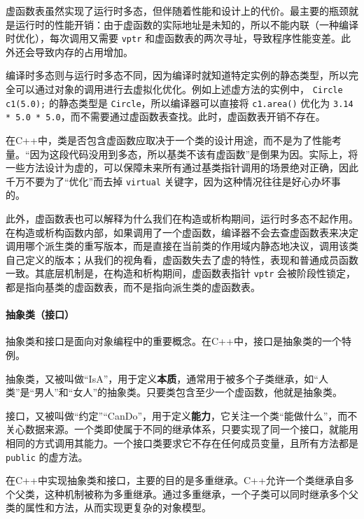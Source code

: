虚函数表虽然实现了运行时多态，但伴随着性能和设计上的代价。最主要的瓶颈就是运行时的性能开销：由于虚函数的实际地址是未知的，所以不能内联（一种编译时优化），每次调用又需要 \verb|vptr| 和虚函数表的两次寻址，导致程序性能变差。此外还会导致内存的占用增加。

编译时多态则与运行时多态不同，因为编译时就知道特定实例的静态类型，所以完全可以通过对象的调用进行去虚拟化优化。例如上述虚方法的实例中， \verb|Circle c1(5.0);| 的静态类型是 \verb|Circle|，所以编译器可以直接将 \verb|c1.area()| 优化为 \verb|3.14 * 5.0 * 5.0|，而不需要通过虚函数表查找。此时，虚函数表开销不存在。

在C++中，类是否包含虚函数应取决于一个类的设计用途，而不是为了性能考量。“因为这段代码没用到多态，所以基类不该有虚函数”是倒果为因。实际上，将一些方法设计为虚的，可以保障未来所有通过基类指针调用的场景绝对正确，因此千万不要为了“优化”而去掉 \verb|virtual| 关键字，因为这种情况往往是好心办坏事的。

此外，虚函数表也可以解释为什么我们在构造或析构期间，运行时多态不起作用。在构造或析构函数内部，如果调用了一个虚函数，编译器不会去查虚函数表来决定调用哪个派生类的重写版本，而是直接在当前类的作用域内静态地决议，调用该类自己定义的版本；从我们的视角看，虚函数失去了虚的特性，表现和普通成员函数一致。其底层机制是，在构造和析构期间，虚函数表指针 \verb|vptr| 会被阶段性锁定，都是指向基类的虚函数表，而不是指向派生类的虚函数表。

\paragraph{抽象类（接口）}

抽象类和接口是面向对象编程中的重要概念。在C++中，接口是抽象类的一个特例。

抽象类，又被叫做“IsA”，用于定义\textbf{本质}，通常用于被多个子类继承，如“人类”是“男人”和“女人”的抽象类。只要类包含至少一个虚函数，他就是抽象类。

接口，又被叫做“约定”“CanDo”，用于定义\textbf{能力}，它关注一个类“能做什么”，而不关心数据来源。一个类即使属于不同的继承体系，只要实现了同一个接口，就能用相同的方式调用其能力。一个接口类要求它不存在任何成员变量，且所有方法都是 \verb|public| 的虚方法。

在C++中实现抽象类和接口，主要的目的是多重继承。C++允许一个类继承自多个父类，这种机制被称为多重继承。通过多重继承，一个子类可以同时继承多个父类的属性和方法，从而实现更复杂的对象模型。

